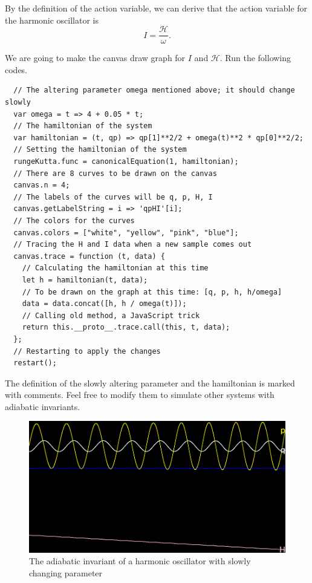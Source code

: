 \documentclass[12pt]{article}
\begin{document}
By the definition of the action variable,
we can derive that the action variable for the harmonic oscillator is \cite[p. 300]{arnold1989mathmech}\cite[p. 157]{landau1976mechanics}
\begin{equation*}
  I=\frac{\mathcal H}\omega.
\end{equation*}

We are going to make the canvas draw graph for $I$ and $\mathcal H$.
Run the following codes.

\begin{verbatim}
  // The altering parameter omega mentioned above; it should change slowly
  var omega = t => 4 + 0.05 * t;
  // The hamiltonian of the system
  var hamiltonian = (t, qp) => qp[1]**2/2 + omega(t)**2 * qp[0]**2/2;
  // Setting the hamiltonian of the system
  rungeKutta.func = canonicalEquation(1, hamiltonian);
  // There are 8 curves to be drawn on the canvas
  canvas.n = 4;
  // The labels of the curves will be q, p, H, I
  canvas.getLabelString = i => 'qpHI'[i];
  // The colors for the curves
  canvas.colors = ["white", "yellow", "pink", "blue"];
  // Tracing the H and I data when a new sample comes out
  canvas.trace = function (t, data) {
    // Calculating the hamiltonian at this time
    let h = hamiltonian(t, data);
    // To be drawn on the graph at this time: [q, p, h, h/omega]
    data = data.concat([h, h / omega(t)]);
    // Calling old method, a JavaScript trick
    return this.__proto__.trace.call(this, t, data);
  };
  // Restarting to apply the changes
  restart();
\end{verbatim}

The definition of the slowly altering parameter and the hamiltonian is marked with comments.
Feel free to modify them to simulate other systems with adiabatic invariants.

\begin{figure}[h]
  \centering
  \includegraphics[width=0.6\linewidth]{adiabatic.png}
  \caption{The adiabatic invariant of a harmonic oscillator with slowly changing parameter}
  \label{fig:adiabatic}
\end{figure}
\end{document}

